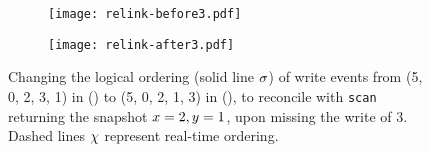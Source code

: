 \begin{figure}[t]
\begin{subfigure}[t]{0.49\textwidth}
\texttt{[image: relink-before3.pdf]}
\caption{\label{fig:reorder:before}} %
\end{subfigure} \hfill
\begin{subfigure}[t]{0.49\textwidth}
\texttt{[image: relink-after3.pdf]}
\caption{\label{fig:reorder:after}} %
\end{subfigure}%
%
\caption{\label{fig:reorder} Changing the logical ordering (solid line
  $\sigma$) of write events from (5, 0, 2, 3, 1) in
  () to (5, 0, 2, 1, 3) in
  (), to reconcile with {\tt scan} returning
  the snapshot $x=2, y=1$, upon missing the write of $3$. Dashed
  lines $\chi$ represent real-time ordering.}
\end{figure}
\vspace{-1mm}
